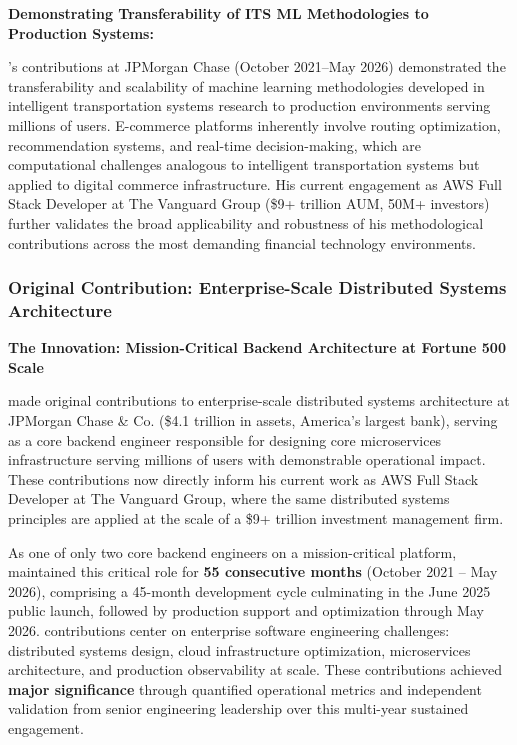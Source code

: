 
\textbf{Demonstrating Transferability of ITS ML Methodologies to Production Systems:}

\dr's contributions at JPMorgan Chase (October 2021--May 2026) demonstrated the transferability and scalability of machine learning methodologies developed in intelligent transportation systems research to production environments serving millions of users. E-commerce platforms inherently involve routing optimization, recommendation systems, and real-time decision-making, which are computational challenges analogous to intelligent transportation systems but applied to digital commerce infrastructure. His current engagement as AWS Full Stack Developer at The Vanguard Group (\$9+ trillion AUM, 50M+ investors) further validates the broad applicability and robustness of his methodological contributions across the most demanding financial technology environments.

\subsubsection{Original Contribution: Enterprise-Scale Distributed Systems Architecture}
\label{original:jpmc}

\textbf{The Innovation: Mission-Critical Backend Architecture at Fortune 500 Scale}

\dr made original contributions to enterprise-scale distributed systems architecture at JPMorgan Chase \& Co. (\$4.1 trillion in assets, America's largest bank), serving as a core backend engineer responsible for designing core microservices infrastructure serving millions of users with demonstrable operational impact. These contributions now directly inform his current work as AWS Full Stack Developer at The Vanguard Group, where the same distributed systems principles are applied at the scale of a \$9+ trillion investment management firm.

As one of only two core backend engineers on a mission-critical platform, \dr maintained this critical role for \textbf{55 consecutive months} (October 2021 -- May 2026), comprising a 45-month development cycle culminating in the June 2025 public launch, followed by production support and optimization through May 2026. \drs contributions center on enterprise software engineering challenges: distributed systems design, cloud infrastructure optimization, microservices architecture, and production observability at scale. These contributions achieved \textbf{major significance} through quantified operational metrics and independent validation from senior engineering leadership over this multi-year sustained engagement. 

